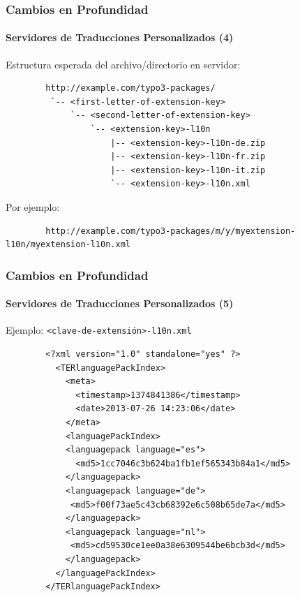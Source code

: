 
\begin{frame}[fragile]
	\frametitle{Cambios en Profundidad}
	\framesubtitle{Servidores de Traducciones Personalizados (4)}

	Estructura esperada del archivo/directorio en servidor:

	\begin{lstlisting}
		http://example.com/typo3-packages/
		 `-- <first-letter-of-extension-key>
		     `-- <second-letter-of-extension-key>
		         `-- <extension-key>-l10n
		             |-- <extension-key>-l10n-de.zip
		             |-- <extension-key>-l10n-fr.zip
		             |-- <extension-key>-l10n-it.zip
		             `-- <extension-key>-l10n.xml
	\end{lstlisting}

	Por ejemplo:

	\begin{lstlisting}
		http://example.com/typo3-packages/m/y/myextension-l10n/myextension-l10n.xml
	\end{lstlisting}

\end{frame}


\begin{frame}[fragile]
	\frametitle{Cambios en Profundidad}
	\framesubtitle{Servidores de Traducciones Personalizados (5)}

	Ejemplo: \texttt{<clave-de-extensión>-l10n.xml}

	\lstset{
		basicstyle=\tiny\ttfamily
	}

	\begin{lstlisting}
		<?xml version="1.0" standalone="yes" ?>
		  <TERlanguagePackIndex>
		    <meta>
		      <timestamp>1374841386</timestamp>
		      <date>2013-07-26 14:23:06</date>
		    </meta>
		    <languagePackIndex>
		    <languagepack language="es">
		      <md5>1cc7046c3b624ba1fb1ef565343b84a1</md5>
		    </languagepack>
		    <languagepack language="de">
		     <md5>f00f73ae5c43cb68392e6c508b65de7a</md5>
		    </languagepack>
		    <languagepack language="nl">
		     <md5>cd59530ce1ee0a38e6309544be6bcb3d</md5>
		    </languagepack>
		  </languagePackIndex>
		</TERlanguagePackIndex>
	\end{lstlisting}

\end{frame}

